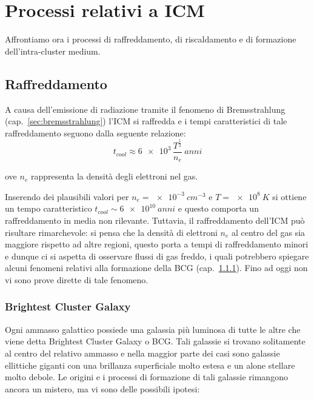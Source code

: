 \section{Processi relativi a ICM}
Affrontiamo ora i processi di raffreddamento, di riscaldamento e di formazione dell’intra-cluster medium.

\subsection{Raffreddamento}
A causa dell’emissione di radiazione tramite il fenomeno di Bremsstrahlung (cap.~\ref{sec:bremsstrahlung}) l’ICM si raffredda e i tempi caratteristici di tale raffreddamento seguono dalla seguente relazione:
\begin{equation}
    t_{cool} \approx \num{6e3}\,\frac{T^{\frac{1}{2}}}{n_e}\:\si{anni}
\end{equation}

\begin{description}
    \item ove $n_e$ rappresenta la densità degli elettroni nel gas.
\end{description} 

Inserendo dei plausibili valori per $n_e = \SI{e-3}{cm^{-3}}$ e $T = \SI{e8}{K}$ si ottiene un tempo caratteristico $t_{cool}\sim\SI{6e10}{anni}$ e questo comporta un raffreddamento in media non rilevante.
Tuttavia, il raffreddamento dell'ICM può risultare rimarchevole: si pensa che la densità di elettroni $n_e$ al centro del gas sia maggiore rispetto ad altre regioni, questo porta a tempi di raffreddamento minori e dunque ci si aspetta di osservare flussi di gas freddo, i quali potrebbero spiegare alcuni fenomeni relativi alla formazione della BCG (cap.~\ref{sec:brightest-cluster-galaxy}). Fino ad oggi non vi sono prove dirette di tale fenomeno.

\subsubsection{Brightest Cluster Galaxy}\label{sec:brightest-cluster-galaxy}
Ogni ammasso galattico possiede una galassia più luminosa di tutte le altre che viene detta Brightest Cluster Galaxy o BCG.
Tali galassie si trovano solitamente al centro del relativo ammasso e nella maggior parte dei casi sono galassie ellittiche giganti con una brillanza superficiale molto estesa e un alone stellare molto debole.
Le origini e i processi di formazione di tali galassie rimangono ancora un mistero, ma vi sono delle possibili ipotesi:

